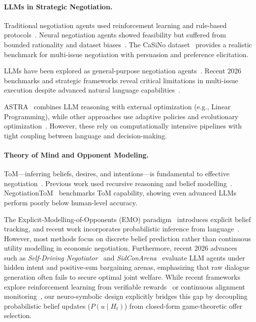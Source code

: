 \documentclass[11pt]{article}
\begin{document}
\paragraph{LLMs in Strategic Negotiation.}
Traditional negotiation agents used reinforcement learning and rule-based protocols~\cite{emergentcomm,opponentlearning}. Neural negotiation agents showed feasibility but suffered from bounded rationality and dataset biases~\cite{dealornodeal}. The CaSiNo dataset~\cite{casino} provides a realistic benchmark for multi-issue negotiation with persuasion and preference elicitation.

LLMs have been explored as general-purpose negotiation agents~\cite{llmdecision}. Recent 2026 benchmarks and strategic frameworks reveal critical limitations in multi-issue execution despite advanced natural language capabilities~\cite{bargainingeval,sidconarena2026,selfdriving2026}.

ASTRA~\cite{astra} combines LLM reasoning with external optimization (e.g., Linear Programming), while other approaches use adaptive policies and evolutionary optimization~\cite{emergentcomm}. However, these rely on computationally intensive pipelines with tight coupling between language and decision-making.

\paragraph{Theory of Mind and Opponent Modeling.}
ToM—inferring beliefs, desires, and intentions—is fundamental to effective negotiation~\cite{cleverhans,socialreasoning}. Previous work used recursive reasoning and belief modelling~\cite{opponentlearning}. NegotiationToM~\cite{negotiationtom} benchmarks ToM capability, showing even advanced LLMs perform poorly below human-level accuracy.

The Explicit-Modelling-of-Opponents (EMO) paradigm~\cite{emo2023} introduces explicit belief tracking, and recent work incorporates probabilistic inference from language~\cite{multiagentllm}. However, most methods focus on discrete belief prediction rather than continuous utility modelling in economic negotiation. Furthermore, recent 2026 advances such as \textit{Self-Driving Negotiator}~\cite{selfdriving2026} and \textit{SidConArena}~\cite{sidconarena2026} evaluate LLM agents under hidden intent and positive-sum bargaining arenas, emphasizing that raw dialogue generation often fails to secure optimal joint welfare. While recent frameworks explore reinforcement learning from verifiable rewards~\cite{strategicbargaining2026} or continuous alignment monitoring~\cite{arbiter2026}, our neuro-symbolic design explicitly bridges this gap by decoupling probabilistic belief updates ($P(u \mid H_t)$) from closed-form game-theoretic offer selection.
\end{document}

